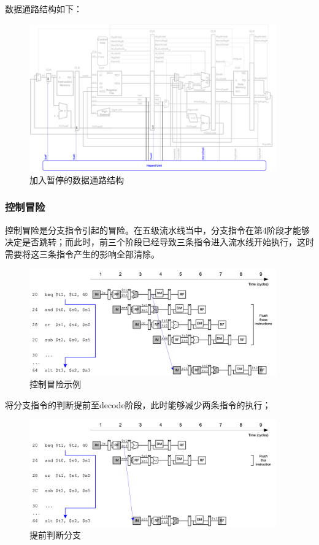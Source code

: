数据通路结构如下：
\begin{figure}[htbp]
    \centering
    \includegraphics[width = 0.95\textwidth]{image/hazard_with_pause.png}
    \caption{加入暂停的数据通路结构}
    \label{fig:section_2_8}
\end{figure}

\newpage

\subsubsection{控制冒险}
控制冒险是分支指令引起的冒险。在五级流水线当中，分支指令在第4阶段才能够决定是否跳转；而此时，前三个阶段已经导致三条指令进入流水线开始执行，这时需要将这三条指令产生的影响全部清除。
\begin{figure}[htbp]
    \centering
    \includegraphics[width = 0.95\textwidth]{image/control_hazard.png}
    \caption{控制冒险示例}
    \label{fig:section_2_9}
\end{figure}

将分支指令的判断提前至decode阶段，此时能够减少两条指令的执行；
\begin{figure}[htbp]
    \centering
    \includegraphics[width = 0.95\textwidth]{image/early_branch.png}
    \caption{提前判断分支}
    \label{fig:section_2_9}
\end{figure}

